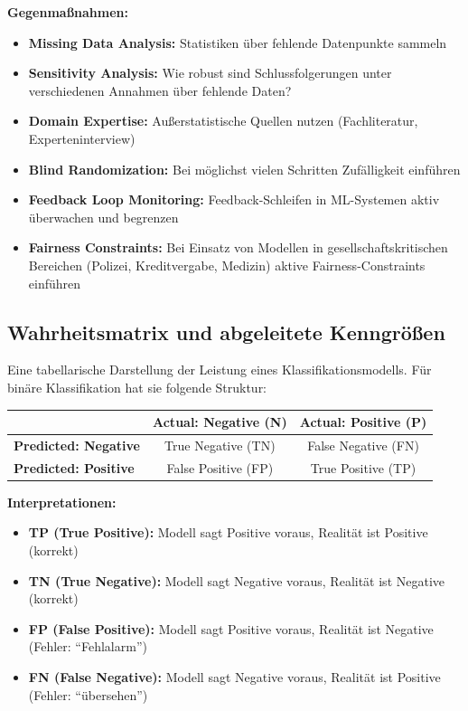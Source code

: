 \textbf{Gegenmaßnahmen:}
\begin{itemize}[leftmargin=1.5em]
    \item \textbf{Missing Data Analysis:} Statistiken über fehlende Datenpunkte sammeln
    \item \textbf{Sensitivity Analysis:} Wie robust sind Schlussfolgerungen unter verschiedenen Annahmen über fehlende Daten?
    \item \textbf{Domain Expertise:} Außerstatistische Quellen nutzen (Fachliteratur, Experteninterview)
    \item \textbf{Blind Randomization:} Bei möglichst vielen Schritten Zufälligkeit einführen
    \item \textbf{Feedback Loop Monitoring:} Feedback-Schleifen in ML-Systemen aktiv überwachen und begrenzen
    \item \textbf{Fairness Constraints:} Bei Einsatz von Modellen in gesellschaftskritischen Bereichen (Polizei, Kreditvergabe, Medizin) aktive Fairness-Constraints einführen
\end{itemize}

\newpage

\subsection{Wahrheitsmatrix und abgeleitete Kenngrößen}

Eine tabellarische Darstellung der Leistung eines Klassifikationsmodells. Für binäre Klassifikation hat sie folgende Struktur:

\begin{center}
\begin{tabular}{|l|c|c|}
    \hline
    \textbf{} & \textbf{Actual: Negative (N)} & \textbf{Actual: Positive (P)} \\
    \hline
    \textbf{Predicted: Negative} & True Negative (TN) & False Negative (FN) \\
    \hline
    \textbf{Predicted: Positive} & False Positive (FP) & True Positive (TP) \\
    \hline
\end{tabular}
\end{center}

\textbf{Interpretationen:}
\begin{itemize}[leftmargin=1.5em]
    \item \textbf{TP (True Positive):} Modell sagt Positive voraus, Realität ist Positive (korrekt)
    \item \textbf{TN (True Negative):} Modell sagt Negative voraus, Realität ist Negative (korrekt)
    \item \textbf{FP (False Positive):} Modell sagt Positive voraus, Realität ist Negative (Fehler: ``Fehlalarm'')
    \item \textbf{FN (False Negative):} Modell sagt Negative voraus, Realität ist Positive (Fehler: ``übersehen'')
\end{itemize}

